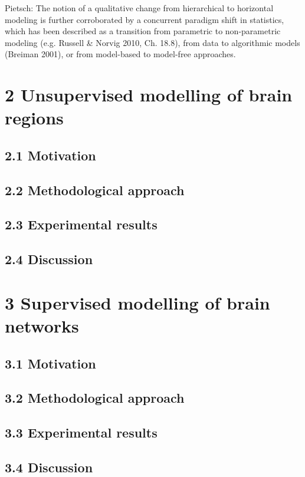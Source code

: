 \documentclass[authoryear,review,3p]{elsarticle}
\begin{document}
Pietsch:
The notion of a qualitative change from hierarchical to horizontal modeling is further corroborated by a concurrent paradigm shift in statistics, which has been described as a transition from parametric to non-parametric modeling (e.g. Russell & Norvig 2010, Ch. 18.8), from data to algorithmic models (Breiman 2001), or from model-based to model-free approaches.



\section*{2 Unsupervised modelling of brain regions}

\subsection*{2.1 Motivation}
\subsection*{2.2 Methodological approach}
\subsection*{2.3 Experimental results}
\subsection*{2.4 Discussion}



\section*{3 Supervised modelling of brain networks}

\subsection*{3.1 Motivation}
\subsection*{3.2 Methodological approach}
\subsection*{3.3 Experimental results}
\subsection*{3.4 Discussion}
\end{document}
